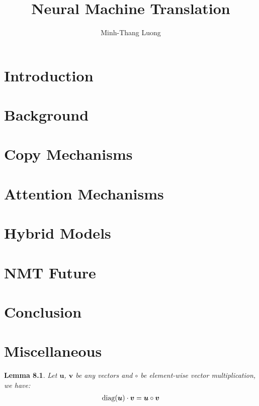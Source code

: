 \documentclass[12pt]{report}
\newcommand{\edot}{\circ}
\newtheorem{lemma}{Lemma}
\begin{document}
\title{Neural Machine Translation}
\author{Minh-Thang Luong}

\beforepreface
%
%
\afterpreface


\chapter{Introduction}
\label{c:intro}


\chapter{Background}
\label{c:background}


\chapter{Copy Mechanisms}
\label{c:copy}


\chapter{Attention Mechanisms}
\label{c:attention}


\chapter{Hybrid Models}
\label{c:hybrid}


\chapter{NMT Future}
\label{c:future}


\chapter{Conclusion}
\label{c:conclude}



\appendix
\chapter{Miscellaneous}
\label{c:misc}
\begin{lemma}
\label{l:diag_mul}
Let $\bm{u}$, $\bm{v}$ be any vectors and $\edot$ be element-wise vector multiplication, we have:
\begin{align}
\diag (\bm{u}) \cdot \bm{v} = \bm{u} \edot \bm{v}
\end{align}
\end{lemma}
\end{document}
